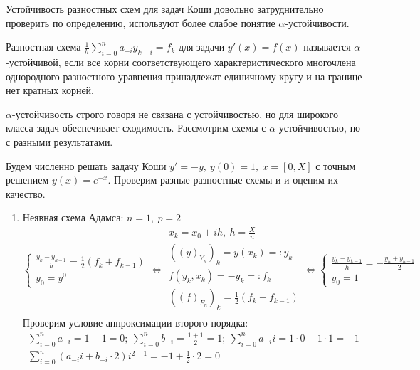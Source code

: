 Устойчивость разностных схем для задач Коши довольно
затруднительно проверить по определению, используют более слабое понятие
$\alpha$-устойчивости.

\begin{definition}
  Разностная схема $\frac{1}{h}\sum\limits_{i=0}^{n}a_{-i}y_{k-i}=f_k$ для задачи
  $y'(x)=f(x)$ называется $\alpha$-устойчивой, если все корни
  соответствующего характеристического многочлена однородного
  разностного уравнения принадлежат единичному кругу и на границе
  нет кратных корней.
\end{definition}

\begin{remark}
  $\alpha$-устойчивость строго говоря не связана с устойчивостью, но
  для широкого класса задач обеспечивает сходимость.
  Рассмотрим схемы с $\alpha$-устойчивостью, но с разными
  результатами.
  \begin{example}
    Будем численно решать задачу Коши $y'=-y,\ y(0)=1,\ x=[0,X]$
    с точным решением $y(x)=e^{-x}$. Проверим разные разностные схемы и
    и оценим их качество.
    \begin{enumerate}
      \item Неявная схема Адамса: $n=1,\ p=2$
            \[
              \begin{cases}
                \frac{y_{k}-y_{k-1}}{h}=\frac{1}{2}\left({f_{k}+f_{k-1}}\right) \\
                y_0=y^0
              \end{cases} \Leftrightarrow
              \begin{array}{c}
                x_k=x_0+ih,\ h=\frac{X}{n}                            \\
                ((y)_{Y_n})_k=y(x_k)=:y_k                             \\
                f(y_{k},x_k)=-y_k=:f_{k}                              \\
                ((f)_{F_n})_k=\frac{1}{2}\left({f_{k}+f_{k-1}}\right) \\
              \end{array}\Leftrightarrow
              \begin{cases}
                \frac{y_k-y_{k-1}}{h}=-\frac{y_k+y_{k-1}}{2} \\
                y_0=1
              \end{cases}
            \]
            Проверим условие аппроксимации второго порядка:
            \[\begin{array}{c}
                \sum\limits_{i=0}^na_{-i}=1-1=0;\ \sum\limits_{i=0}^nb_{-i}=\frac{1+1}{2}=1;\ \sum\limits_{i=0}^na_{-i}i=1\cdot0 - 1\cdot1=-1 \\
                \sum\limits_{i=0}^n(a_{-i}i+b_{-i}\cdot2)i^{2-1}=-1 + \frac{1}{2}\cdot2=0
              \end{array}\]


\end{enumerate}
\end{example}
\end{remark}
